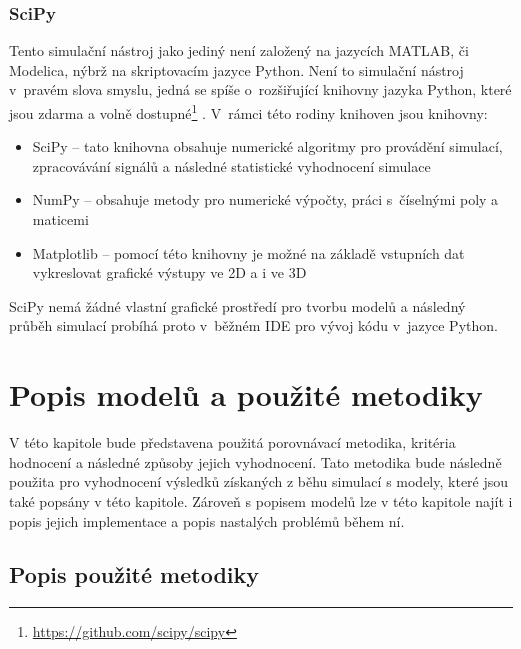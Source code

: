
\subsection{SciPy}
\label{chapter-scipy}
Tento simulační nástroj jako jediný není založený na jazycích MATLAB, či Modelica, nýbrž na skriptovacím jazyce Python. Není to simulační nástroj v~pravém slova smyslu, jedná se spíše o~rozšiřující knihovny jazyka Python, které jsou zdarma a volně dostupné\footnote{\url{https://github.com/scipy/scipy}} \cite{scipy}. V~rámci této rodiny knihoven jsou knihovny:
\begin{itemize}
    \item SciPy -- tato knihovna obsahuje numerické algoritmy pro provádění simulací, zpracovávání signálů a následné statistické vyhodnocení simulace
    \item NumPy -- obsahuje metody pro numerické výpočty, práci s~číselnými poly a maticemi
    \item Matplotlib -- pomocí této knihovny je možné na základě vstupních dat vykreslovat grafické výstupy ve 2D a i ve 3D
\end{itemize}

SciPy nemá žádné vlastní grafické prostředí pro tvorbu modelů a následný průběh simulací probíhá proto v~běžném IDE pro vývoj kódu v~jazyce Python.


\chapter{Popis modelů a použité metodiky}
\label{kapitola4}
V této kapitole bude představena použitá porovnávací metodika, kritéria hodnocení a následné způsoby jejich vyhodnocení. Tato metodika bude následně použita pro vyhodnocení výsledků získaných z běhu simulací s modely, které jsou také popsány v této kapitole. Zároveň s popisem modelů lze v této kapitole najít i popis jejich implementace a popis nastalých problémů během ní.

\section{Popis použité metodiky}

